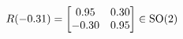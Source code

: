 \documentclass[preview]{standalone}
\begin{document}
\begin{align*}
\special{dvisvgm:raw <g id='unique000'>}R(-0.31) = \begin{bmatrix} 0.95 & 0.30 \\ -0.30 & 0.95 \end{bmatrix} \in \text{SO}(2)\special{dvisvgm:raw </g>}
\end{align*}
\end{document}

